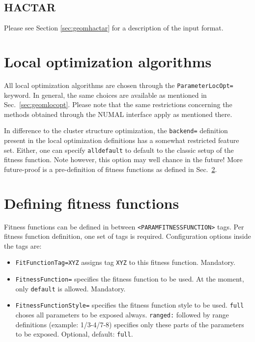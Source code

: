 \documentclass[a4paper,10pt]{scrbook}
\begin{document}
\subsection{HACTAR}
Please see Section \ref{sec:geomhactar} for a description of the input format.

\section{Local optimization algorithms}
All local optimization algorithms are chosen through the
\texttt{ParameterLocOpt=} keyword. In general, the same choices are available 
as mentioned in Sec.~\ref{sec:geomlocopt}. Please note that the same 
restrictions concerning the methods obtained through the NUMAL interface apply 
as mentioned there.

In difference to the cluster structure optimization, the \texttt{backend=} 
definition present in the local optimization definitions has a somewhat 
restricted feature set. Either, one can specify \texttt{alldefault} to default 
to the classic setup of the fitness function. Note however, this option may 
well chance in the future! More future-proof is a pre-definition of fitness 
functions as defined in Sec.~\ref{sec:paramfitfuncdef}.

\section{Defining fitness functions}
\label{sec:paramfitfuncdef}
Fitness functions can be defined in between \texttt{<PARAMFITNESSFUNCTION>} 
tags. Per fitness function definition, one set of tags is required. 
Configuration options inside the tags are:
\begin{itemize}
  \item \texttt{FitFunctionTag=XYZ} assigns tag \texttt{XYZ} to this fitness 
function. Mandatory.
  \item \texttt{FitnessFunction=} specifies the fitness function to be used. At 
the moment, only \texttt{default} is allowed. Mandatory.
  \item \texttt{FitnessFunctionStyle=} specifies the fitness function style to 
be used. \texttt{full} choses all parameters to be exposed always. 
\texttt{ranged:} followed by range definitions (example: 1/3-4/7-8) specifies 
only these parts of the parameters to be exposed. Optional, default: 
\texttt{full}.
\end{itemize}
\end{document}
